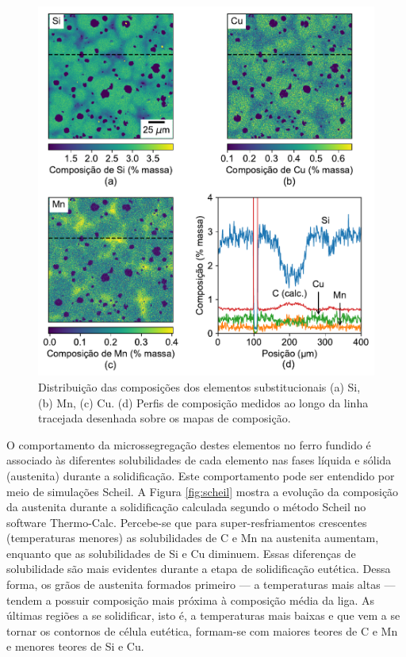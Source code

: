 \begin{figure}
  \centering
  \includegraphics[width=.9\textwidth]{img/EPMA/EPMA.pdf}
  \caption{Distribuição das composições dos elementos substitucionais (a) Si, (b) Mn, (c) Cu. (d) Perfis de composição medidos ao longo da linha tracejada desenhada sobre os mapas de composição.}
  \label{fig:EPMA}
\end{figure}

O comportamento da microssegregação destes elementos no ferro fundido é associado às diferentes solubilidades de cada elemento nas fases líquida e sólida (austenita) durante a solidificação. Este comportamento pode ser entendido por meio de simulações Scheil. A Figura \ref{fig:scheil} mostra a evolução da composição da austenita durante a solidificação calculada segundo o método Scheil no software Thermo-Calc\textregistered{}. Percebe-se que para super-resfriamentos crescentes (temperaturas menores) as solubilidades de C e Mn na austenita aumentam, enquanto que as solubilidades de Si e Cu diminuem. Essas diferenças de solubilidade são mais evidentes durante a etapa de solidificação eutética. Dessa forma, os grãos de austenita formados primeiro --- a temperaturas mais altas --- tendem a possuir composição mais próxima à composição média da liga. As últimas regiões a se solidificar, isto é, a temperaturas mais baixas e que vem a se tornar os contornos de célula eutética, formam-se com maiores teores de C e Mn e menores teores de Si e Cu.
 
